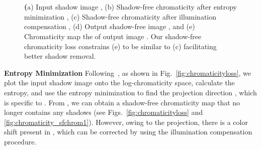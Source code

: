 \documentclass[10pt,twocolumn,letterpaper]{article}
\begin{document}
\begin{figure}[t]
	\centering
\captionsetup[subfloat]{farskip=2pt}
	\hfill
	\hfill
	\hfill
	\hfill
	\hfill\\
	\vspace{-0.015in}
	\setcounter{subfigure}{0}
	\hfill
	\hfill
	\hfill
	\hfill
	\hfill\\
	\vspace{-0.01in}
	\caption{\textbf (a) Input shadow image ,  (b) Shadow-free chromaticity after entropy minimization , (c) Shadow-free chromaticity after illumination compensation , (d) Output shadow-free image , and (e) Chromaticity map the of output image . Our shadow-free chromaticity loss constrains (e) to be similar to (c) facilitating better shadow removal.}
	\vspace{-0.1in}
	\label{fig:chromaticity}
\end{figure}

\vspace{0.2cm}
\noindent \textbf{Entropy Minimization} 
Following~\cite{Finlayson09}, as shown in Fig.~\ref{fig:chromaticityloss}, we plot the input shadow image  onto the log-chromaticity space, calculate the entropy, and use the entropy minimization to find the projection direction , which is specific to . 
From , we can obtain a shadow-free chromaticity map  that no longer contains any shadows (see Figs.~\ref{fig:chromaticityloss} and \ref{fig:chromaticity_sfchrom1}).
However, owing to the projection, there is a color shift present in , which can be corrected by using the illumination compensation procedure.
\end{document}
